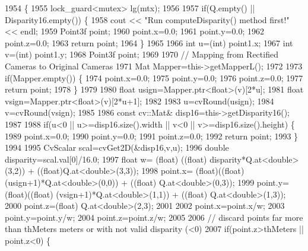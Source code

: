 \begin{DoxyCode}
1954                                                                           \{
1955     lock\_guard<mutex> lg(mtx);
1956 
1957     \textcolor{keywordflow}{if}(Q.empty() || Disparity16.empty()) \{
1958         cout << \textcolor{stringliteral}{"Run computeDisparity() method first!"} << endl;
1959         Point3f point;
1960         point.x=0.0;
1961         point.y=0.0;
1962         point.z=0.0;
1963         \textcolor{keywordflow}{return} point;
1964     \}
1965 
1966     \textcolor{keywordtype}{int} u=(int) point1.x;
1967     \textcolor{keywordtype}{int} v=(\textcolor{keywordtype}{int}) point1.y;
1968     Point3f point;
1969 
1970     \textcolor{comment}{// Mapping from Rectified Cameras to Original Cameras}
1971     Mat Mapper=this->getMapperL();
1972 
1973     \textcolor{keywordflow}{if}(Mapper.empty()) \{
1974         point.x=0.0;
1975         point.y=0.0;
1976         point.z=0.0;
1977         \textcolor{keywordflow}{return} point;
1978     \}
1979 
1980     \textcolor{keywordtype}{float} usign=Mapper.ptr<\textcolor{keywordtype}{float}>(v)[2*u];
1981     \textcolor{keywordtype}{float} vsign=Mapper.ptr<\textcolor{keywordtype}{float}>(v)[2*u+1];
1982 
1983     u=cvRound(usign);
1984     v=cvRound(vsign);
1985 
1986     \textcolor{keyword}{const} cv::Mat& disp16=this->getDisparity16();
1987 
1988     \textcolor{keywordflow}{if}(u<0 || u>=disp16.size().width || v<0 || v>=disp16.size().height) \{
1989         point.x=0.0;
1990         point.y=0.0;
1991         point.z=0.0;
1992         \textcolor{keywordflow}{return} point;
1993     \}
1994 
1995     CvScalar scal=cvGet2D(&disp16,v,u);
1996     \textcolor{keywordtype}{double} disparity=scal.val[0]/16.0;
1997     \textcolor{keywordtype}{float} w= (float) ((\textcolor{keywordtype}{float}) disparity*Q.at<\textcolor{keywordtype}{double}>(3,2)) + ((float)Q.at<\textcolor{keywordtype}{double}>(3,3));
1998     point.x= (float)((\textcolor{keywordtype}{float}) (usign+1)*Q.at<\textcolor{keywordtype}{double}>(0,0)) + ((\textcolor{keywordtype}{float}) Q.at<\textcolor{keywordtype}{double}>(0,3));
1999     point.y=(float)((\textcolor{keywordtype}{float}) (vsign+1)*Q.at<\textcolor{keywordtype}{double}>(1,1)) + ((\textcolor{keywordtype}{float}) Q.at<\textcolor{keywordtype}{double}>(1,3));
2000     point.z=(float) Q.at<\textcolor{keywordtype}{double}>(2,3);
2001 
2002     point.x=point.x/w;
2003     point.y=point.y/w;
2004     point.z=point.z/w;
2005 
2006     \textcolor{comment}{// discard points far more than thMeters meters or with not valid disparity (<0)}
2007     \textcolor{keywordflow}{if}(point.z>thMeters || point.z<0) \{

\end{DoxyCode}
